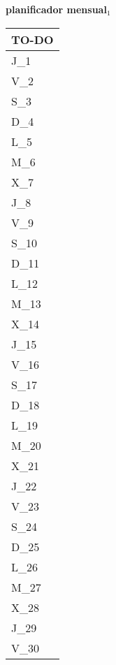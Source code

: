 \clearpage
\raggedright{
	\fontsize{25}{50}\selectfont
	\textbf{\NextYear}
}\scriptsize{\textbf{planificador mensual$_1$}}\\[11.3pt]



	\noindent\dotfill
	\renewcommand{\arraystretch}{1.5}\scriptsize
		\begin{longtabu} to \textwidth { X[l]}
		\centering \small{\textbf{TO-DO}} \\
		\toprule
		J_{1} \dotfill\\
		V_{2} \dotfill\\
		S_{3} \dotfill\\
		D_{4} \dotfill\\
		\hline
		L_{5} \dotfill\\
		M_{6} \dotfill\\
		X_{7} \dotfill\\
		J_{8} \dotfill\\
		V_{9} \dotfill\\
		S_{10} \dotfill\\
		D_{11} \dotfill\\
		\hline
		L_{12} \dotfill\\
		M_{13} \dotfill\\
		X_{14} \dotfill\\
		J_{15} \dotfill\\
		V_{16} \dotfill\\
		S_{17} \dotfill\\
		D_{18} \dotfill\\
		\hline
		L_{19} \dotfill\\
		M_{20} \dotfill\\
		X_{21} \dotfill\\
		J_{22} \dotfill\\
		V_{23} \dotfill\\
		S_{24} \dotfill\\
		D_{25} \dotfill\\
		\hline
		L_{26} \dotfill\\
		M_{27} \dotfill\\
		X_{28} \dotfill\\
		J_{29} \dotfill\\
		V_{30} \dotfill\\

		\bottomrule

	\end{longtabu}


\clearpage

